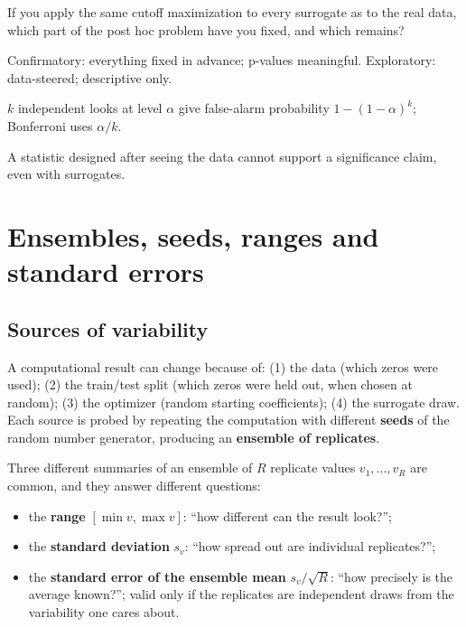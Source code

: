 \begin{checkpoint}
If you apply the same cutoff maximization to every surrogate as to the real data, which part of the post hoc problem have you fixed, and which remains?
\end{checkpoint}

\begin{keyideas}
\item Confirmatory: everything fixed in advance; p-values meaningful. Exploratory: data-steered; descriptive only.
\item $k$ independent looks at level $\alpha$ give false-alarm probability $1-(1-\alpha)^k$; Bonferroni uses $\alpha/k$.
\item A statistic designed after seeing the data cannot support a significance claim, even with surrogates.
\end{keyideas}

\section{Ensembles, seeds, ranges and standard errors}\label{sec:controls-ensembles}

\subsection{Sources of variability}

A computational result can change because of: (1) the data (which zeros were used); (2) the train/test split (which zeros were held out, when chosen at random); (3) the optimizer (random starting coefficients); (4) the surrogate draw. Each source is probed by repeating the computation with different \textbf{seeds} of the random number generator, producing an \textbf{ensemble of replicates}.

Three different summaries of an ensemble of $R$ replicate values $v_1,\dots,v_R$ are common, and they answer different questions:
\begin{itemize}
\item the \textbf{range} $[\min v,\max v]$: ``how different can the result look?'';
\item the \textbf{standard deviation} $s_v$: ``how spread out are individual replicates?'';
\item the \textbf{standard error of the ensemble mean} $s_v/\sqrt R$: ``how precisely is the average known?''; valid only if the replicates are independent draws from the variability one cares about.
\end{itemize}


